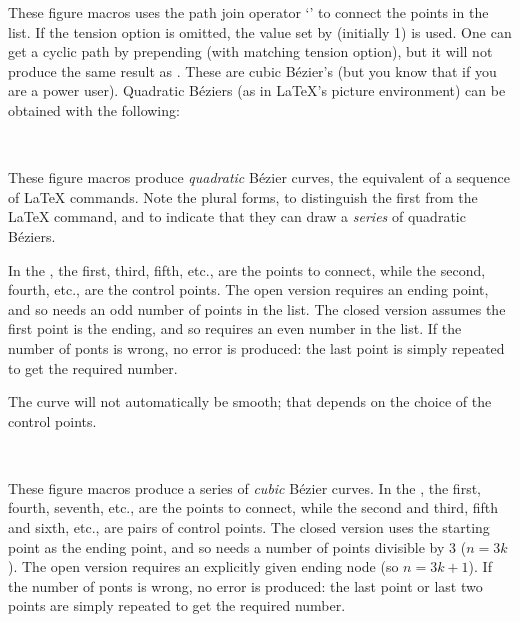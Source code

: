 \documentclass[letterpaper]{article}
\begin{document}
These figure macros uses the \MF{} path join operator `' to connect the points in the list. If the tension option
 is omitted, the value set by 
(initially 1) is used. One can get a cyclic path by prepending
 (with matching tension option), but it will not produce the
same result as . These are cubic B\'ezier's (but you
know that if you are a power user). Quadratic B\'eziers (as in
\LaTeX{}'s picture environment) can be obtained with the following:

\begin{cd}
  \\
%
\end{cd}

These figure macros produce \emph{quadratic} B\'ezier curves, the
equivalent of a sequence of \LaTeX{}  commands. Note the
plural forms, to distinguish the first from the \LaTeX{} command, and to
indicate that they can draw a \emph{series} of quadratic B\'eziers.

In the , the first, third, fifth, etc., are the points to
connect, while the second, fourth, etc., are the control points. The
open version requires an ending point, and so needs an odd number of
points in the list. The closed version assumes the first point is the
ending, and so requires an even number in the list. If the number of
ponts is wrong, no error is produced: the last point is simply repeated
to get the required number.

The curve will not automatically be smooth; that depends on the choice
of the control points.

\begin{cd}
  \\
%
\end{cd}

These figure macros produce a series of \emph{cubic} B\'ezier curves. In
the , the first, fourth, seventh, etc., are the points to
connect, while the second and third, fifth and sixth, etc., are pairs of
control points. The closed version uses the starting point as the ending
point, and so needs a number of points divisible by $3$ ($n=3k$). The
open version requires an explicitly given ending node (so $n=3k+1$).
If the number of ponts is wrong, no error is produced: the last point
or last two points are simply repeated to get the required number.
\end{document}
